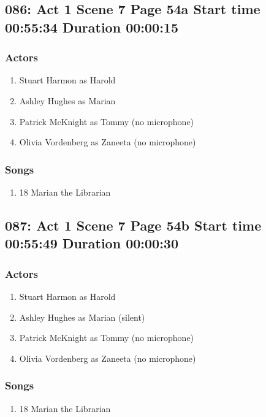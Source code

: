 \subsection{086: Act 1 Scene 7 Page 54a Start time 00:55:34 Duration 00:00:15}

\subsubsection{Actors}
\begin{enumerate}
\item Stuart Harmon as Harold
\item Ashley Hughes as Marian
\item Patrick McKnight as Tommy (no microphone)
\item Olivia Vordenberg as Zaneeta (no microphone)
\end{enumerate}

\subsubsection{Songs}
\begin{enumerate}
\item 18 Marian the Librarian
\end{enumerate}
\subsection{087: Act 1 Scene 7 Page 54b Start time 00:55:49 Duration 00:00:30}

\subsubsection{Actors}
\begin{enumerate}
\item Stuart Harmon as Harold
\item Ashley Hughes as Marian (silent)
\item Patrick McKnight as Tommy (no microphone)
\item Olivia Vordenberg as Zaneeta (no microphone)
\end{enumerate}

\subsubsection{Songs}
\begin{enumerate}
\item 18 Marian the Librarian
\end{enumerate}
